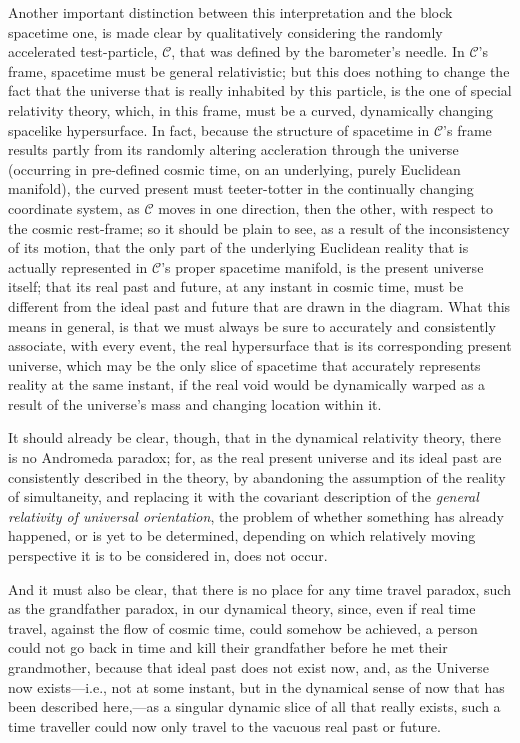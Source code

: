 Another important distinction between this interpretation and the block spacetime one, is made clear by qualitatively considering the randomly accelerated test-particle, $\mathcal{C}$, that was defined by the barometer's needle. In $\mathcal{C}$'s frame, spacetime must be general relativistic; but this does nothing to change the fact that the universe that is really inhabited by this particle, is the one of special relativity theory, which, in this frame, must be a curved, dynamically changing spacelike hypersurface. In fact, because the structure of spacetime in $\mathcal{C}$'s frame results partly from its randomly altering accleration through the universe (occurring in pre-defined cosmic time, on an underlying, purely Euclidean manifold), the curved present must teeter-totter in the continually changing coordinate system, as $\mathcal{C}$ moves in one direction, then the other, with respect to the cosmic rest-frame; so it should be plain to see, as a result of the inconsistency of its motion, that the only part of the underlying Euclidean reality that is actually represented in $\mathcal{C}$'s proper spacetime manifold, is the present universe itself; that its real past and future, at any instant in cosmic time, must be different from the ideal past and future that are drawn in the diagram. What this means in general, is that we must always be sure to accurately and consistently associate, with every event, the real hypersurface that is its corresponding present universe, which may be the only slice of spacetime that accurately represents reality at the same instant, if the real void would be dynamically warped as a result of the universe's mass and changing location within it. 

It should already be clear, though, that in the dynamical relativity theory, there is no Andromeda paradox; for, as the real present universe and its ideal past are consistently described in the theory, by abandoning the assumption of the reality of simultaneity, and replacing it with the covariant description of the \textit{general relativity of universal orientation}, the problem of whether something has already happened, or is yet to be determined, depending on which relatively moving perspective it is to be considered in, does not occur. 

And it must also be clear, that there is no place for any time travel paradox, such as the grandfather paradox, in our dynamical theory, since, even if real time travel, against the flow of cosmic time, could somehow be achieved, a person could not go back in time and kill their grandfather before he met their grandmother, because that ideal past does not exist now, and, as the Universe now exists---i.e., not at some instant, but in the dynamical sense of now that has been described here,---as a singular dynamic slice of all that really exists, such a time traveller could now only travel to the vacuous real past or future. 

